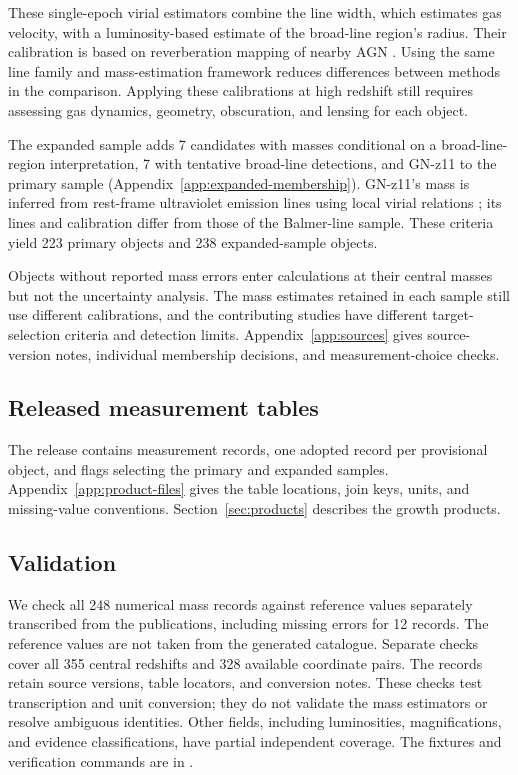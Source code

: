\documentclass[pdflatex,sn-basic]{sn-jnl}
\begin{document}
These single-epoch virial estimators combine the line width, which estimates
gas velocity, with a luminosity-based estimate of the broad-line region's radius.
Their calibration is based on reverberation mapping of nearby AGN \citep{shen2013}.
Using the same line family and mass-estimation framework reduces differences
between methods in the comparison. Applying these calibrations at high redshift
still requires assessing gas dynamics, geometry, obscuration, and lensing for
each object.

The expanded sample adds 7 candidates with masses conditional on a
broad-line-region interpretation, 7 with tentative broad-line detections, and
GN-z11 to the primary sample (Appendix~\ref{app:expanded-membership}). GN-z11's mass is inferred from rest-frame ultraviolet
emission lines using local virial relations \citep{maiolino2024}; its lines and
calibration differ from those of the Balmer-line sample.
These criteria yield 223 primary objects and 238 expanded-sample objects.

Objects without reported mass errors enter calculations at their central
masses but not the uncertainty analysis.
The mass estimates retained in each sample still use different calibrations,
and the contributing studies have different target-selection criteria and
detection limits.
Appendix~\ref{app:sources} gives source-version notes, individual
membership decisions, and measurement-choice checks.

\subsection{Released measurement tables}

The release contains measurement records, one adopted record per provisional
object, and flags selecting the primary and expanded samples.
Appendix~\ref{app:product-files} gives the table locations, join keys, units,
and missing-value conventions. Section~\ref{sec:products} describes the growth
products.

\subsection{Validation}
\label{sec:validation}

We check all 248 numerical mass records against reference values separately
transcribed from the publications, including missing errors for 12 records. The reference
values are not taken from the generated catalogue.
Separate checks cover all 355 central redshifts and 328 available coordinate
pairs. The records retain source versions, table locators, and conversion
notes. These checks test transcription and unit conversion; they do not
validate the mass estimators or resolve ambiguous identities. Other fields,
including luminosities, magnifications, and evidence classifications, have
partial independent coverage. The fixtures and verification commands are in
.
\end{document}
